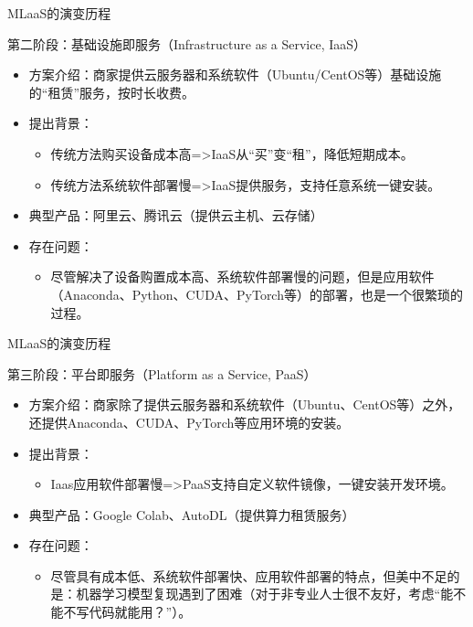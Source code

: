\documentclass{beamer}
\begin{document}
\begin{frame}{MLaaS的演变历程}
	\begin{exampleblock}{第二阶段：基础设施即服务（Infrastructure as a Service, IaaS）}
    \begin{itemize} %
    	\item 方案介绍：商家提供云服务器和系统软件（Ubuntu/CentOS等）基础设施的“租赁”服务，按时长收费。
    	\item 提出背景：
    		\begin{itemize}
				\item 传统方法购买设备成本高=>IaaS从“买”变“租”，降低短期成本。
				\item 传统方法系统软件部署慢=>IaaS提供服务，支持任意系统一键安装。
			\end{itemize}
		\item 典型产品：阿里云、腾讯云（提供云主机、云存储）
    	\item 存在问题：
    	\begin{itemize}
			\item 尽管解决了设备购置成本高、系统软件部署慢的问题，但是应用软件（Anaconda、Python、CUDA、PyTorch等）的部署，也是一个很繁琐的过程。
       	\end{itemize}
    \end{itemize}
    \end{exampleblock}
\end{frame}

\begin{frame}{MLaaS的演变历程}
	\begin{exampleblock}{第三阶段：平台即服务（Platform as a Service, PaaS）}
    \begin{itemize} %
    	\item 方案介绍：商家除了提供云服务器和系统软件（Ubuntu、CentOS等）之外，还提供Anaconda、CUDA、PyTorch等应用环境的安装。
    	\item 提出背景：
    		\begin{itemize}
				\item Iaas应用软件部署慢=>PaaS支持自定义软件镜像，一键安装开发环境。
			\end{itemize}
		\item 典型产品：Google Colab、AutoDL（提供算力租赁服务）
    	\item 存在问题：
    	\begin{itemize}
			\item 尽管具有成本低、系统软件部署快、应用软件部署的特点，但美中不足的是：机器学习模型复现遇到了困难（对于非专业人士很不友好，考虑“能不能不写代码就能用？”）。
       	\end{itemize}
    \end{itemize}
    \end{exampleblock}
\end{frame}
\end{document}
